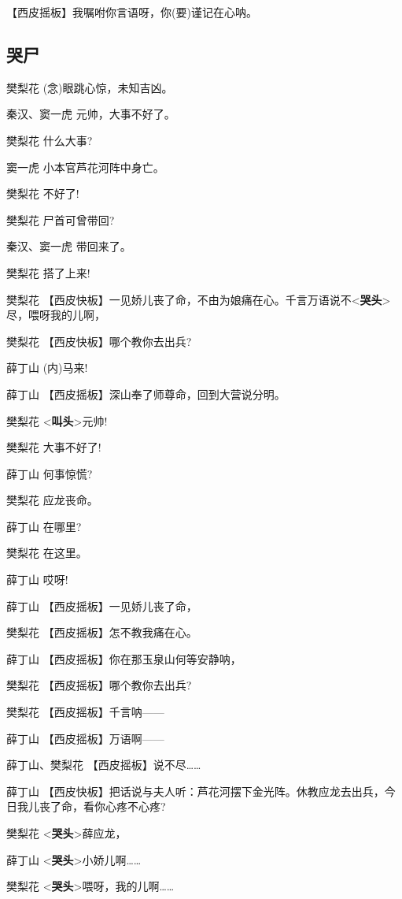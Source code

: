 【西皮摇板】我嘱咐你言语呀，你(要)谨记在心呐。

\hypertarget{ux54edux5c38}{%
\subsection{哭尸}\label{ux54edux5c38}}

樊梨花 (念)眼跳心惊，未知吉凶。

秦汉、窦一虎 元帅，大事不好了。

樊梨花 什么大事?

窦一虎 小本官芦花河阵中身亡。

樊梨花 不好了!

樊梨花 尸首可曾带回?

秦汉、窦一虎 带回来了。

樊梨花 搭了上来!

樊梨花
【西皮快板】一见娇儿丧了命，不由为娘痛在心。千言万语说不\textless{}\textbf{哭头}\textgreater{}尽，喂呀我的儿啊，

樊梨花 【西皮快板】哪个教你去出兵?

薛丁山 (内)马来!

薛丁山 【西皮摇板】深山奉了师尊命，回到大营说分明。

樊梨花 \textless{}\textbf{叫头}\textgreater{}元帅!

樊梨花 大事不好了!

薛丁山 何事惊慌?

樊梨花 应龙丧命。

薛丁山 在哪里?

樊梨花 在这里。

薛丁山 哎呀!

薛丁山 【西皮摇板】一见娇儿丧了命，

樊梨花 【西皮摇板】怎不教我痛在心。

薛丁山 【西皮摇板】你在那玉泉山何等安静呐，

樊梨花 【西皮摇板】哪个教你去出兵?

樊梨花 【西皮摇板】千言呐------

薛丁山 【西皮摇板】万语啊------

薛丁山、樊梨花 【西皮摇板】说不尽\ldots{}\ldots{}

薛丁山
【西皮快板】把话说与夫人听：芦花河摆下金光阵。休教应龙去出兵，今日我儿丧了命，看你心疼不心疼?

樊梨花 \textless{}\textbf{哭头}\textgreater{}薛应龙，

薛丁山 \textless{}\textbf{哭头}\textgreater{}小娇儿啊\ldots{}\ldots{}

樊梨花
\textless{}\textbf{哭头}\textgreater{}喂呀，我的儿啊\ldots{}\ldots{}


